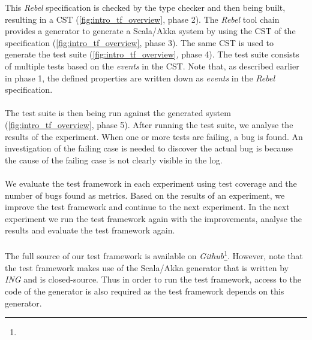 This \textit{Rebel} specification is checked by the type checker and then being
built, resulting in a CST (\autoref{fig:intro_tf_overview}, phase 2). The
\textit{Rebel} tool chain provides a generator to generate a Scala/Akka system
by using the CST of the specification (\autoref{fig:intro_tf_overview}, phase 3).
The same CST is used to generate the test suite
(\autoref{fig:intro_tf_overview}, phase 4). The test suite consists of multiple
tests based on the \textit{events} in the CST. Note that, as described earlier in phase 1,
the defined properties are written down as \textit{events} in the
\textit{Rebel} specification.\\
\\
The test suite is then being run against the generated system (\autoref{fig:intro_tf_overview}, phase 5). After running the test suite, we analyse the results of the experiment. When one or more tests are failing, a bug is found. An
investigation of the failing case is needed to discover the actual bug is because the cause of the failing case is not clearly visible in the log.\\
\\
We evaluate the test framework in each experiment using test coverage and the number of bugs found as metrics. Based on the results of an experiment, we improve the test framework and continue to the next experiment. In the next experiment we run the test framework again with the improvements, analyse the results and evaluate the test framework again.\\
\\
The full source of our test framework is available on \textit{Github}\footnote{}. However, note that the test framework makes use of the Scala/Akka generator that is written by \textit{ING} and is closed-source. Thus in order to run the test framework, access to the code of the generator is also required as the test framework depends on this generator.



